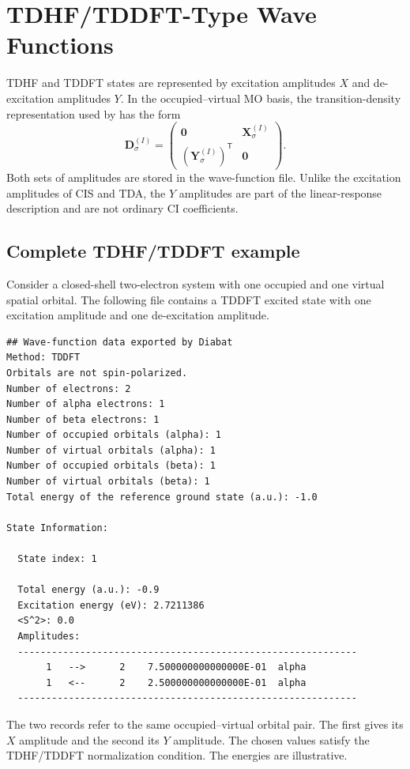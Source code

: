 \section{TDHF/TDDFT-Type Wave Functions}\label{sec-diabat-wfn-tdhf-tddft}
TDHF and TDDFT states are represented by excitation amplitudes $X$ and de-excitation amplitudes $Y$. In the occupied--virtual MO basis, the transition-density representation used by \progname{} has the form
\begin{equation}
\mathbf{D}^{(I)}_\sigma=
\begin{pmatrix}
\mathbf{0} & \mathbf{X}^{(I)}_\sigma\\
(\mathbf{Y}^{(I)}_\sigma)^{\mathsf T} & \mathbf{0}
\end{pmatrix}.
\end{equation}
Both sets of amplitudes are stored in the wave-function file. Unlike the excitation amplitudes of CIS and TDA, the $Y$ amplitudes are part of the linear-response description and are not ordinary CI coefficients.

\subsection*{Complete TDHF/TDDFT example}
Consider a closed-shell two-electron system with one occupied and one virtual spatial orbital. The following file contains a TDDFT excited state with one excitation amplitude and one de-excitation amplitude.
\begin{lstlisting}[style=technicalfile]
## Wave-function data exported by Diabat
Method: TDDFT
Orbitals are not spin-polarized.
Number of electrons: 2
Number of alpha electrons: 1
Number of beta electrons: 1
Number of occupied orbitals (alpha): 1
Number of virtual orbitals (alpha): 1
Number of occupied orbitals (beta): 1
Number of virtual orbitals (beta): 1
Total energy of the reference ground state (a.u.): -1.0

State Information:

  State index: 1

  Total energy (a.u.): -0.9
  Excitation energy (eV): 2.7211386
  <S^2>: 0.0
  Amplitudes:
  ------------------------------------------------------------
       1   -->      2    7.500000000000000E-01  alpha
       1   <--      2    2.500000000000000E-01  alpha
  ------------------------------------------------------------
\end{lstlisting}
The two records refer to the same occupied--virtual orbital pair. The first gives its $X$ amplitude and the second its $Y$ amplitude. The chosen values satisfy the TDHF/TDDFT normalization condition. The energies are illustrative.

